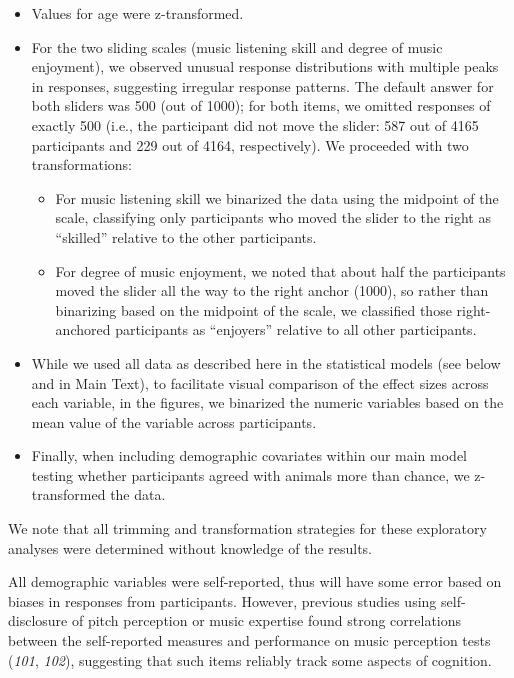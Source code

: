 \documentclass[
]{article}
\providecommand{\tightlist}{%
  \setlength{\itemsep}{0pt}\setlength{\parskip}{0pt}}
\begin{document}
\begin{itemize}
\tightlist
\item
  Values for age were z-transformed.\\
\item
  For the two sliding scales (music listening skill and degree of music
  enjoyment), we observed unusual response distributions with multiple
  peaks in responses, suggesting irregular response patterns. The
  default answer for both sliders was 500 (out of 1000); for both items,
  we omitted responses of exactly 500 (i.e., the participant did not
  move the slider: 587 out of 4165 participants and 229 out of 4164,
  respectively). We proceeded with two transformations:

  \begin{itemize}
  \tightlist
  \item
    For music listening skill we binarized the data using the midpoint
    of the scale, classifying only participants who moved the slider to
    the right as ``skilled'' relative to the other participants.\\
  \item
    For degree of music enjoyment, we noted that about half the
    participants moved the slider all the way to the right anchor
    (1000), so rather than binarizing based on the midpoint of the
    scale, we classified those right-anchored participants as
    ``enjoyers'' relative to all other participants.
  \end{itemize}
\item
  While we used all data as described here in the statistical models
  (see below and in Main Text), to facilitate visual comparison of the
  effect sizes across each variable, in the figures, we binarized the
  numeric variables based on the mean value of the variable across
  participants.\\
\item
  Finally, when including demographic covariates within our main model
  testing whether participants agreed with animals more than chance, we
  z-transformed the data.
\end{itemize}

We note that all trimming and transformation strategies for these
exploratory analyses were determined without knowledge of the results.

All demographic variables were self-reported, thus will have some error
based on biases in responses from participants. However, previous
studies using self-disclosure of pitch perception or music expertise
found strong correlations between the self-reported measures and
performance on music perception tests (\emph{101}, \emph{102}),
suggesting that such items reliably track some aspects of cognition.
\end{document}
